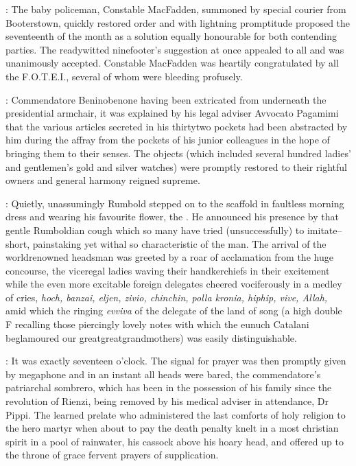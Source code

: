 :
The baby policeman, Constable MacFadden, summoned by special courier from
Booterstown, quickly restored order and with lightning promptitude
proposed the seventeenth of the month as a solution equally honourable for
both contending parties. The readywitted ninefooter's suggestion at once
appealed to all and was unanimously accepted. Constable MacFadden was
heartily congratulated by all the F.O.T.E.I., several of whom were
bleeding profusely.

:
Commendatore Beninobenone having been extricated
from underneath the presidential armchair, it was explained by his legal
adviser Avvocato Pagamimi that the various articles secreted in his
thirtytwo pockets had been abstracted by him during the affray from the
pockets of his junior colleagues in the hope of bringing them to their
senses. The objects (which included several hundred ladies' and
gentlemen's gold and silver watches) were promptly restored to their
rightful owners and general harmony reigned supreme.

:
Quietly, unassumingly Rumbold stepped on to the scaffold in faultless
morning dress and wearing his favourite flower,
the .
He announced his presence by that gentle Rumboldian cough which so
many have tried (unsuccessfully) to imitate--short, painstaking yet withal
so characteristic of the man. The arrival of the worldrenowned headsman
was greeted by a roar of acclamation from the huge concourse, the
viceregal ladies waving their handkerchiefs in their excitement while the
even more excitable foreign delegates cheered vociferously in a medley of
cries, \emph{hoch, banzai, eljen, zivio, chinchin, polla kronia, hiphip, vive,
Allah,} amid which the ringing \emph{evviva} of the delegate of the land of song
(a high double F recalling those piercingly lovely notes with which the
eunuch Catalani beglamoured our greatgreatgrandmothers) was easily
distinguishable.

:
It was exactly seventeen o'clock. The signal for prayer
was then promptly given by megaphone and in an instant all heads were
bared, the commendatore's patriarchal sombrero, which has been in the
possession of his family since the revolution of Rienzi, being removed by
his medical adviser in attendance, Dr Pippi. The learned prelate who
administered the last comforts of holy religion to the hero martyr when
about to pay the death penalty knelt in a most christian spirit in a pool
of rainwater, his cassock above his hoary head, and offered up to the
throne of grace fervent prayers of supplication.

